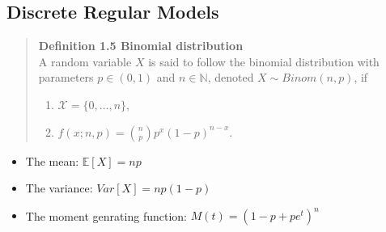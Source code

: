 \documentclass{article}
\begin{document}
\subsection{Discrete Regular Models}
\label{sec-3-1}
\begin{quote}
\textbf{Definition 1.5 Binomial distribution}\\
A random variable $X$ is said to follow the binomial distribution with parameters $p \in (0,1)$ and $n \in \mathbb{N}$, denoted $X \sim Binom(n,p)$, if

\begin{enumerate}
\item $\mathcal{X} = \{0, \ldots ,n\}$,
\item $\displaystyle f(x;n,p) = \binom{n}{p}p^{x}(1-p)^{n-x}$.
\end{enumerate}
\end{quote}
\begin{itemize}
\item The mean: $\mathbb{E}[X] = np$
\item The variance: $Var[X] = np(1-p)$
\item The moment genrating function: $M(t) = (1- p + pe^{t})^{n}$
\end{itemize}
\end{document}

